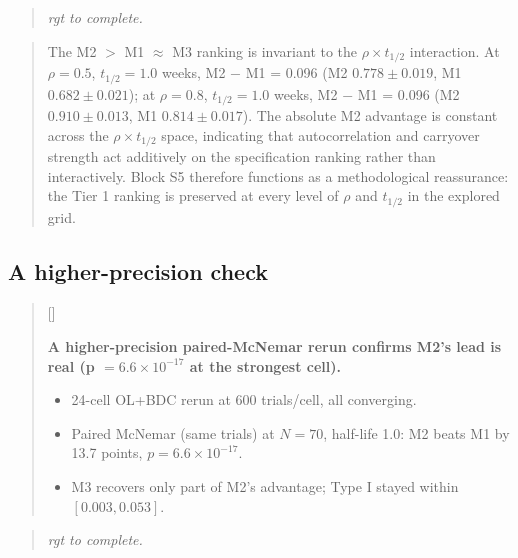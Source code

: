 \documentclass[
  11pt,
]{article}
\newcounter{pgraph}
\newenvironment{bullets}{%
  \stepcounter{pgraph}%
  \begin{quote}\small\sffamily\color[gray]{0.30}%
  {\normalfont\scriptsize\color[gray]{0.58}[\thepgraph]\enspace}}{%
  \end{quote}}
\newenvironment{rgt}{%
  \begin{quote}\small\itshape\color[RGB]{20,60,160}}{%
  \end{quote}}
\newenvironment{orig}{%
  \begin{quote}\normalsize\color[gray]{0.55}}{%
  \end{quote}}
\begin{document}
\begin{rgt}
rgt to complete.

\end{rgt}

\begin{orig}
The M2 \(>\) M1 \(\approx\) M3 ranking is invariant to the
\(\rho \times t_{1/2}\) interaction. At \(\rho = 0.5\),
\(t_{1/2} = 1.0\) weeks, M2 \(-\) M1 = 0.096 (M2 \(0.778 \pm 0.019\),
M1 \(0.682 \pm 0.021\)); at \(\rho = 0.8\), \(t_{1/2} = 1.0\) weeks,
M2 \(-\) M1 = 0.096 (M2 \(0.910 \pm 0.013\), M1 \(0.814 \pm 0.017\)).
The absolute M2 advantage is constant across the
\(\rho \times t_{1/2}\) space, indicating that autocorrelation and
carryover strength act additively on the specification ranking
rather than interactively. Block S5 therefore functions as a
methodological reassurance: the Tier 1 ranking is preserved at
every level of \(\rho\) and \(t_{1/2}\) in the explored grid.

\end{orig}

\subsection{A higher-precision check}\label{a-higher-precision-check}

\begin{bullets}

\textbf{A higher-precision paired-McNemar rerun confirms M2's lead
is real (p $= 6.6 \times 10^{-17}$ at the strongest cell).}

\begin{itemize}\setlength{\itemsep}{2pt}\setlength{\parskip}{0pt}
\item 24-cell OL+BDC rerun at 600 trials/cell, all converging.
\item Paired McNemar (same trials) at $N = 70$, half-life 1.0: M2
beats M1 by 13.7 points, $p = 6.6 \times 10^{-17}$.
\item M3 recovers only part of M2's advantage; Type I stayed within
$[0.003, 0.053]$.
\end{itemize}

\end{bullets}

\begin{rgt}
rgt to complete.

\end{rgt}
\end{document}
